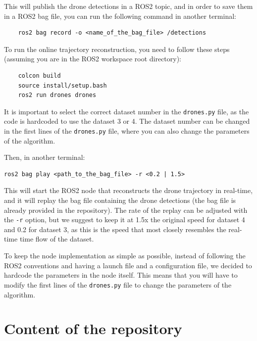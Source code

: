 \documentclass[11pt]{article}
\begin{document}
This will publish the drone detections in a ROS2 topic, and in order to save them in a ROS2 bag file, you can run the following command in another terminal:

\begin{verbatim}
    ros2 bag record -o <name_of_the_bag_file> /detections
\end{verbatim}

To run the online trajectory reconstruction, you need to follow these steps (assuming you are in the ROS2 workspace root directory):

\begin{verbatim}
    colcon build
    source install/setup.bash
    ros2 run drones drones
\end{verbatim}

It is important to select the correct dataset number in the \texttt{drones.py} file, as the code is hardcoded to use the dataset 3 or 4. The dataset number can be changed in the first lines of the \texttt{drones.py} file, where you can also change the parameters of the algorithm.

Then, in another terminal:

\begin{verbatim}
ros2 bag play <path_to_the_bag_file> -r <0.2 | 1.5>
\end{verbatim}

This will start the ROS2 node that reconstructs the drone trajectory in real-time, and it will replay the bag file containing the drone detections (the bag file is already provided in the repository). The rate of the replay can be adjusted with the \texttt{-r} option, but we suggest to keep it at 1.5x the original speed for dataset 4 and 0.2 for dataset 3, as this is the speed that most closely resembles the real-time time flow of the dataset.

To keep the node implementation as simple as possible, instead of following the ROS2 conventions and having a launch file and a configuration file, we decided to hardcode the parameters in the node itself. This means that you will have to modify the first lines of the \texttt{drones.py} file to change the parameters of the algorithm.

\section{Content of the repository}
\end{document}
